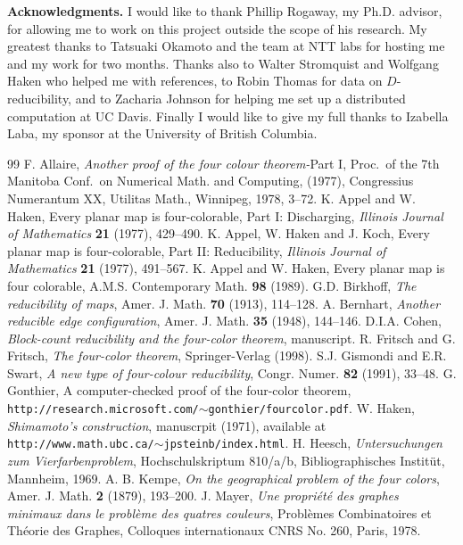 \documentclass[11pt]{article}
\begin{document}
\noindent \textbf{Acknowledgments.} I would like to thank Phillip Rogaway, my Ph.D. advisor, for allowing me to work on this project outside the scope of his research. My greatest thanks to Tatsuaki Okamoto and the team at NTT labs for hosting me and my work for two months. Thanks also to Walter Stromquist and Wolfgang Haken who helped me with references, to Robin Thomas for data on $D$-reducibility, and to Zacharia Johnson for helping me set up a distributed computation at UC Davis. Finally I would like to give my full thanks to Izabella Laba, my sponsor at the University of British Columbia.

\begin{thebibliography}{99}
 F. Allaire, \emph{Another proof of the four colour theorem-}Part I, Proc.~of the 7th Manitoba Conf.~on Numerical Math. and Computing, (1977), Congressius Numerantum XX, Utilitas Math., Winnipeg, 1978, 3--72.
 K. Appel and W. Haken, Every planar map is four-colorable, Part I: Discharging, \emph{Illinois Journal of Mathematics} \textbf{21} (1977), 429--490. 
 K. Appel, W. Haken and J. Koch, Every planar map is four-colorable, Part II: Reducibility, \emph{Illinois Journal of Mathematics} \textbf{21}  (1977), 491--567.
 K. Appel and W. Haken, Every planar map is four colorable, A.M.S. Contemporary Math. \textbf{98} (1989).
 G.D. Birkhoff, \emph{The reducibility of maps}, Amer. J. Math. \textbf{70} (1913), 114--128.
 A. Bernhart, \emph{Another reducible edge configuration}, Amer. J. Math. \textbf{35} (1948), 144--146.
 D.I.A. Cohen, \emph{Block-count reducibility and the four-color theorem}, manuscript.
 R. Fritsch and G. Fritsch, \emph{The four-color theorem}, Springer-Verlag (1998).
 S.J. Gismondi and E.R. Swart, \emph{A new type of four-colour reducibility}, Congr. Numer. \textbf{82} (1991), 33--48.
 G. Gonthier, A computer-checked proof of the four-color theorem, \texttt{http://research.microsoft.com/$\sim$gonthier/fourcolor.pdf}.
 W. Haken, \emph{Shimamoto's construction}, manuscrpit (1971), available at \texttt{http://www.math.}\texttt{ubc.ca/}\texttt{$\sim$jpsteinb/index.html}.
 H. Heesch, \emph{Untersuchungen zum Vierfarbenproblem}, Hochschulskriptum 810/a/b, Bibliographisches Instit\"ut, Mannheim, 1969.
 A. B. Kempe, \emph{On the geographical problem of the four colors}, Amer. J. Math. \textbf{2} (1879), 193--200.
 J. Mayer, \emph{Une propri\'et\'e des graphes minimaux dans le probl\`eme des quatres couleurs}, Probl\`emes Combinatoires et Th\'eorie des Graphes, Colloques internationaux CNRS No. 260, Paris, 1978.

\end{thebibliography}
\end{document}
